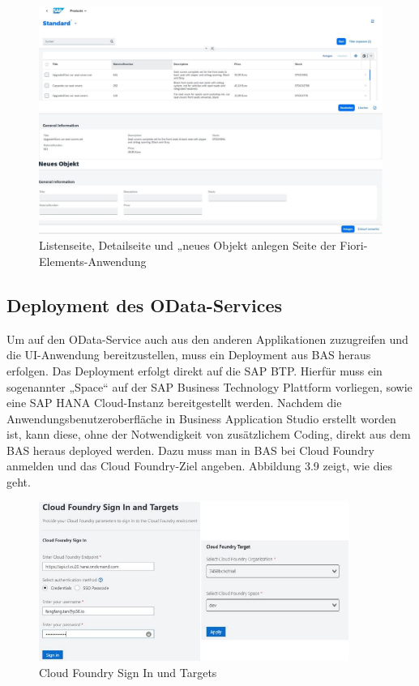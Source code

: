 \begin{figure}[htbp]
 \centering
 \includegraphics[width=1.0\textwidth]{Bilder/fiori_element/3_8_Fiori_Element_list.jpg}
 \caption{Listenseite, Detailseite und „neues Objekt anlegen Seite der Fiori-Elements-Anwendung}
\end{figure}

\subsection{Deployment des OData-Services}

Um auf den OData-Service auch aus den anderen Applikationen zuzugreifen und die UI-Anwendung bereitzustellen, muss ein Deployment aus BAS heraus erfolgen. Das Deployment erfolgt direkt auf die SAP BTP. Hierfür muss ein sogenannter „Space“ auf der SAP Business Technology Plattform vorliegen, sowie eine SAP HANA Cloud-Instanz bereitgestellt werden. Nachdem die Anwendungsbenutzeroberfläche in Business Application Studio erstellt worden ist, kann diese, ohne der Notwendigkeit von zusätzlichem Coding, direkt aus dem BAS heraus deployed werden. Dazu muss man in BAS bei Cloud Foundry anmelden und das Cloud Foundry-Ziel angeben. Abbildung 3.9 zeigt, wie dies geht. 

\begin{figure}[htbp]
 \centering
 \includegraphics[width=0.9\textwidth]{Bilder/fiori_element/3_9_cloud_foundry_targets.jpg}
 \caption{Cloud Foundry Sign In und Targets}
\end{figure}

